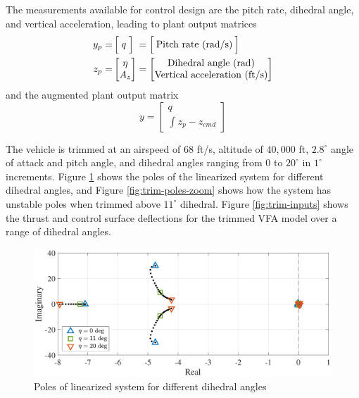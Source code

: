 \documentclass[english]{ifacconf}
\begin{document}
The measurements available for control design are the pitch rate, dihedral angle, and vertical acceleration, leading to plant output matrices
\begin{equation}
\begin{aligned}
y_p =& \, \Big[\; q \; \Big] \;= \Big[\: \text{Pitch rate (rad/s)} \:\Big] \\
z_p =& \begin{bmatrix}
\eta \\
A_z
\end{bmatrix} =\begin{bmatrix}
	$Dihedral angle (rad)$\\
	$Vertical acceleration (ft/s)$
\end{bmatrix}		
\end{aligned}
\end{equation}
and the augmented plant output matrix 
\begin{equation}
y = \begin{bmatrix}
	q \\ \int{z_p - z_{cmd}}
\end{bmatrix}
\end{equation}

The vehicle is trimmed at an airspeed of $68$ ft/s, altitude of $40,000$ ft, $2.8^\circ$ angle of attack and pitch angle, and dihedral angles ranging from $0$ to $20^\circ$ in $1^\circ$ increments. Figure \ref{fig:trim-poles} shows the poles of the linearized system for different dihedral angles, and Figure \ref{fig:trim-poles-zoom} shows how the system has unstable poles when trimmed above $11^\circ$ dihedral. Figure \ref{fig:trim-inputs} shows the thrust and control surface deflections for the trimmed VFA model over a range of dihedral angles.

\begin{figure}[htbp]
	\centering
	\includegraphics[width=0.95\columnwidth]{../fig/trim-poles-2.pdf}
	\caption{Poles of linearized system for different dihedral angles}
	\label{fig:trim-poles}
\end{figure}
\end{document}

